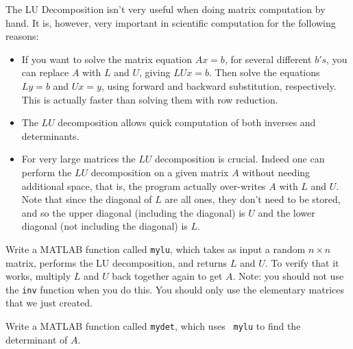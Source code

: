 The LU Decomposition isn't very useful when doing matrix computation
by hand.  It is, however, very important in scientific computation
for the following reasons:
\begin{itemize}
\item If you want to solve the matrix equation $A x = b$, for several different $b's$, you can replace $A$ with $L$ and $U$, giving $L U x = b$.  Then solve the equations $L y = b$ and $U x = y$, using forward and backward substitution, respectively.  This is actually faster than solving them with row reduction.
\item The $LU$ decomposition allows quick computation of both inverses and determinants.
\item For very large matrices the $LU$ decomposition is crucial.  Indeed one can perform the $LU$ decomposition on a given matrix $A$ without needing additional space, that is, the program actually over-writes $A$ with $L$ and $U$.  Note that since the diagonal of $L$ are all ones, they don't need to be stored, and so the upper diagonal (including the diagonal) is $U$ and the lower diagonal (not including the diagonal) is $L$.
\end{itemize}

\begin{problem}
Write a MATLAB function called {\tt mylu}, which takes as input
a random $n\times n$ matrix, performs the LU decomposition, and
returns $L$ and $U$.  To verify that it works, multiply $L$ and $U$
back together again to get $A$. Note: you should not use the {\tt inv} function when you do this. You should only use the elementary matrices that we just created.
\end{problem}

\begin{problem}
Write a MATLAB function called {\tt mydet}, which uses {\tt
mylu} to find the determinant of $A$.
\end{problem}
